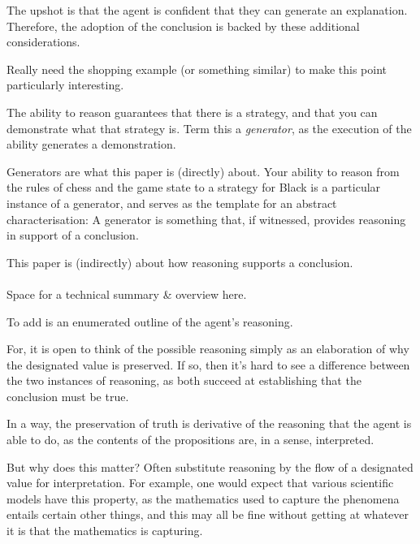 \documentclass[10pt]{article}
\newcommand{\hozlinedash}[0]{%
  \noindent\hdashrule[0.5ex][c]{\textwidth}{.1pt}{2.5pt}
}
\begin{document}
\hozlinedash



\begin{note}
  The upshot is that the agent is confident that they can generate an explanation.
  Therefore, the adoption of the conclusion is backed by these additional considerations.

  Really need the shopping example (or something similar) to make this point particularly interesting.

  \hozlinedash

  The ability to reason guarantees that there is a strategy, and that you can demonstrate what that strategy is.
  Term this a \emph{generator}, as the execution of the ability generates a demonstration.

  Generators are what this paper is (directly) about.
  Your ability to reason from the rules of chess and the game state to a strategy for Black is a particular instance of a generator, and serves as the template for an abstract characterisation:
  A generator is something that, if witnessed, provides reasoning in support of a conclusion.

  This paper is (indirectly) about how reasoning supports a conclusion.
\end{note}

\hozlinedash

\paragraph{ }
\begin{note}
  Space for a technical summary \& overview here.

  To add is an enumerated outline of the agent's reasoning.
\end{note}

{
  \begin{note}[Important]
    For, it is open to think of the possible reasoning simply as an elaboration of why the designated value is preserved.
    If so, then it's hard to see a difference between the two instances of reasoning, as both succeed at establishing that the conclusion must be true.

    In a way, the preservation of truth is derivative of the reasoning that the agent is able to do, as the contents of the propositions are, in a sense, interpreted.
  \end{note}

  But why does this matter?
  Often substitute reasoning by the flow of a designated value for interpretation.
  For example, one would expect that various scientific models have this property, as the mathematics used to capture the phenomena entails certain other things, and this may all be fine without getting at whatever it is that the mathematics is capturing.
}
\end{document}
